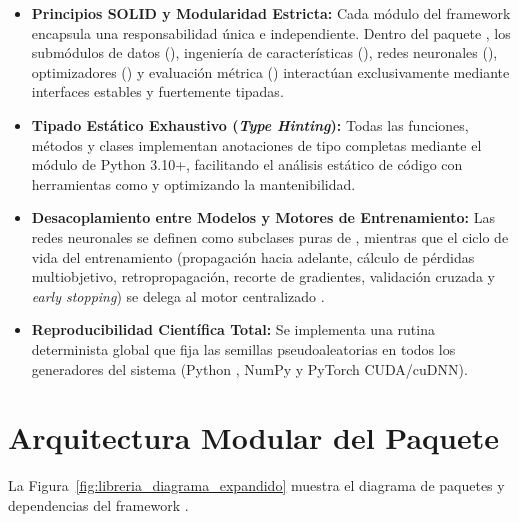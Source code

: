 \begin{itemize}
    \item \textbf{Principios SOLID y Modularidad Estricta:} Cada módulo del framework encapsula una responsabilidad única e independiente. Dentro del paquete , los submódulos de datos (), ingeniería de características (), redes neuronales (), optimizadores () y evaluación métrica () interactúan exclusivamente mediante interfaces estables y fuertemente tipadas.
    \item \textbf{Tipado Estático Exhaustivo (\textit{Type Hinting}):} Todas las funciones, métodos y clases implementan anotaciones de tipo completas mediante el módulo  de Python 3.10+, facilitando el análisis estático de código con herramientas como  y optimizando la mantenibilidad.
    \item \textbf{Desacoplamiento entre Modelos y Motores de Entrenamiento:} Las redes neuronales se definen como subclases puras de , mientras que el ciclo de vida del entrenamiento (propagación hacia adelante, cálculo de pérdidas multiobjetivo, retropropagación, recorte de gradientes, validación cruzada y \textit{early stopping}) se delega al motor centralizado .
    \item \textbf{Reproducibilidad Científica Total:} Se implementa una rutina determinista global que fija las semillas pseudoaleatorias en todos los generadores del sistema (Python , NumPy y PyTorch CUDA/cuDNN).
\end{itemize}



\section{Arquitectura Modular del Paquete }
\label{sec:soft_paquetes}

La Figura~\ref{fig:libreria_diagrama_expandido} muestra el diagrama de paquetes y dependencias del framework .

